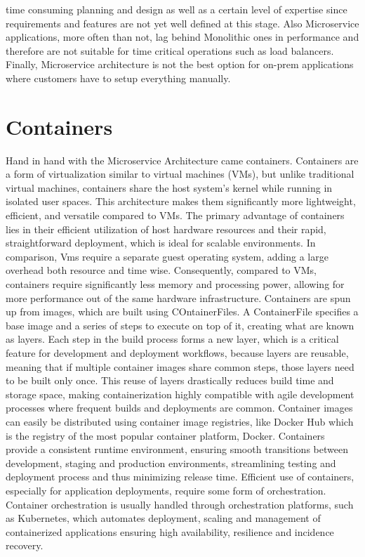 time consuming planning and design as well as a certain level of expertise since requirements and features are not yet well defined at this stage. Also Microservice applications, more often than not, lag behind Monolithic ones in performance and therefore are not suitable for time critical operations such as load balancers. Finally, Microservice architecture is not the best option for on-prem applications where customers have to setup everything manually.\cite{whenmicroarebad}

\section{Containers}

Hand in hand with the Microservice Architecture came containers. Containers are a form of virtualization similar to virtual machines (VMs), but unlike traditional virtual machines, containers share the host system's kernel while running in isolated user spaces. This architecture makes them significantly more lightweight, efficient, and versatile compared to VMs. The primary advantage of containers lies in their efficient utilization of host hardware resources and their rapid, straightforward deployment, which is ideal for scalable environments. In comparison, Vms require a separate guest operating system, adding a large overhead both resource and time wise. Consequently, compared to VMs, containers require significantly less memory and processing power, allowing for more performance out of the same hardware infrastructure.\cite{Pahl2015} Containers are spun up from images, which are built using COntainerFiles. A ContainerFile specifies a base image and a series of steps to execute on top of it, creating what are known as layers. Each step in the build process forms a new layer, which is a critical feature for development and deployment workflows, because layers are reusable, meaning that if multiple container images share common steps, those layers need to be built only once. This reuse of layers drastically reduces build time and storage space, making containerization highly compatible with agile development processes where frequent builds and deployments are common. Container images can easily be distributed using container image registries, like Docker Hub which is the registry of the most popular container platform, Docker. Containers provide a consistent runtime environment, ensuring smooth transitions between development, staging and production environments, streamlining testing and deployment process and thus minimizing release time. Efficient use of containers, especially for application deployments, require some form of orchestration. Container orchestration is usually handled through orchestration platforms, such as Kubernetes, which automates deployment, scaling and management of containerized applications ensuring high availability, resilience and incidence recovery.\cite{dockerDev}

